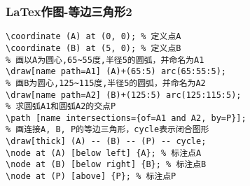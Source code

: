 \begin{frame}[fragile]
\frametitle{LaTex作图-等边三角形2}

\begin{lstlisting}
\coordinate (A) at (0, 0); % 定义点A
\coordinate (B) at (5, 0); % 定义点B
% 画以A为圆心,65~55度,半径5的圆弧，并命名为A1
\draw[name path=A1] (A)+(65:5) arc(65:55:5);
% 画B为圆心,125~115度,半径5的圆弧，并命名为A2
\draw[name path=A2] (B)+(125:5) arc(125:115:5);
% 求圆弧A1和圆弧A2的交点P
\path [name intersections={of=A1 and A2, by=P}]; 
% 画连接A, B, P的等边三角形，cycle表示闭合图形
\draw[thick] (A) -- (B) -- (P) -- cycle; 
\node at (A) [below left] {A}; % 标注点A
\node at (B) [below right] {B}; % 标注点B
\node at (P) [above] {P}; % 标注点P
\end{lstlisting}
\end{frame}
